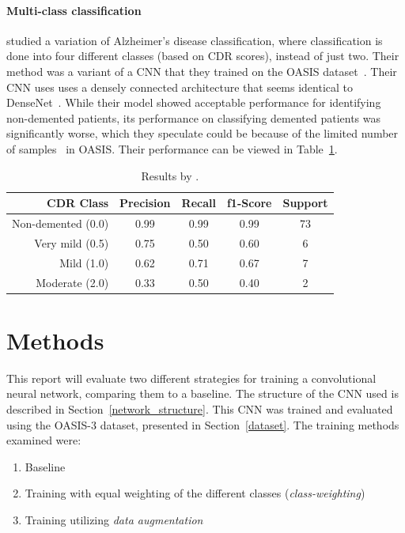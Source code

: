 \documentclass{kththesis}
\begin{document}
\subsubsection{Multi-class classification}
\textcite{islam2018early} studied a variation of Alzheimer's disease classification, where classification is done into four different classes (based on CDR scores), instead of just two. Their method was a variant of a CNN that they trained on the OASIS dataset~\cite{oasis}. Their CNN uses uses a densely connected architecture that seems identical to DenseNet~\cite{huang2017densely}. While their model showed acceptable performance for identifying non-demented patients, its performance on classifying demented patients was significantly worse, which they speculate could be because of the limited number of samples~\cite{islam2018early} in OASIS\@. Their performance can be viewed in Table~\ref{tab:results_islam_zhang}.

\begin{table}[H]
  \begin{center}
    \caption{Results by \textcite{islam2018early}. \label{tab:results_islam_zhang}}
    \begin{tabular}{r|ccc|c}
      \textbf{CDR Class} & \textbf{Precision} & \textbf{Recall} & \textbf{f1-Score} & \textbf{Support} \\
      \toprule
      Non-demented (0.0) & 0.99 & 0.99 & 0.99 & 73 \\
      Very mild (0.5) & 0.75 & 0.50 & 0.60 & 6  \\
      Mild (1.0)         & 0.62 & 0.71 & 0.67 & 7  \\
      Moderate (2.0)     & 0.33 & 0.50 & 0.40 & 2   \\
    \end{tabular}
  \end{center}
\end{table}

\chapter{Methods} \label{methods}
This report will evaluate two different strategies for training a convolutional neural network, comparing them to a baseline. The structure of the CNN used is described in Section~\ref{network_structure}. This CNN was trained and evaluated using the OASIS-3 dataset, presented in Section~\ref{dataset}. The training methods examined were:
\begin{enumerate}
  \item Baseline
  \item Training with equal weighting of the different classes (\textit{class-weighting})
  \item Training utilizing \textit{data augmentation}
\end{enumerate}
\end{document}

